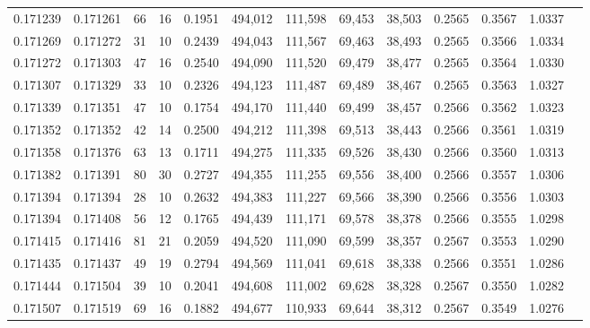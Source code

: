 \begin{tabular}{rrrrrrrrrrrrr}
0.171239 & 0.171261 &    66 &  16 &                                     0.1951 & 494,012 & 111,598 &  69,453 &  38,503 & 0.2565 & 0.3567 & 1.0337 \\
0.171269 & 0.171272 &    31 &  10 &                                     0.2439 & 494,043 & 111,567 &  69,463 &  38,493 & 0.2565 & 0.3566 & 1.0334 \\
0.171272 & 0.171303 &    47 &  16 &                                     0.2540 & 494,090 & 111,520 &  69,479 &  38,477 & 0.2565 & 0.3564 & 1.0330 \\
0.171307 & 0.171329 &    33 &  10 &                                     0.2326 & 494,123 & 111,487 &  69,489 &  38,467 & 0.2565 & 0.3563 & 1.0327 \\
0.171339 & 0.171351 &    47 &  10 &                                     0.1754 & 494,170 & 111,440 &  69,499 &  38,457 & 0.2566 & 0.3562 & 1.0323 \\
0.171352 & 0.171352 &    42 &  14 &                                     0.2500 & 494,212 & 111,398 &  69,513 &  38,443 & 0.2566 & 0.3561 & 1.0319 \\
0.171358 & 0.171376 &    63 &  13 &                                     0.1711 & 494,275 & 111,335 &  69,526 &  38,430 & 0.2566 & 0.3560 & 1.0313 \\
0.171382 & 0.171391 &    80 &  30 &                                     0.2727 & 494,355 & 111,255 &  69,556 &  38,400 & 0.2566 & 0.3557 & 1.0306 \\
0.171394 & 0.171394 &    28 &  10 &                                     0.2632 & 494,383 & 111,227 &  69,566 &  38,390 & 0.2566 & 0.3556 & 1.0303 \\
0.171394 & 0.171408 &    56 &  12 &                                     0.1765 & 494,439 & 111,171 &  69,578 &  38,378 & 0.2566 & 0.3555 & 1.0298 \\
0.171415 & 0.171416 &    81 &  21 &                                     0.2059 & 494,520 & 111,090 &  69,599 &  38,357 & 0.2567 & 0.3553 & 1.0290 \\
0.171435 & 0.171437 &    49 &  19 &                                     0.2794 & 494,569 & 111,041 &  69,618 &  38,338 & 0.2566 & 0.3551 & 1.0286 \\
0.171444 & 0.171504 &    39 &  10 &                                     0.2041 & 494,608 & 111,002 &  69,628 &  38,328 & 0.2567 & 0.3550 & 1.0282 \\
0.171507 & 0.171519 &    69 &  16 &                                     0.1882 & 494,677 & 110,933 &  69,644 &  38,312 & 0.2567 & 0.3549 & 1.0276 \\

\end{tabular}
